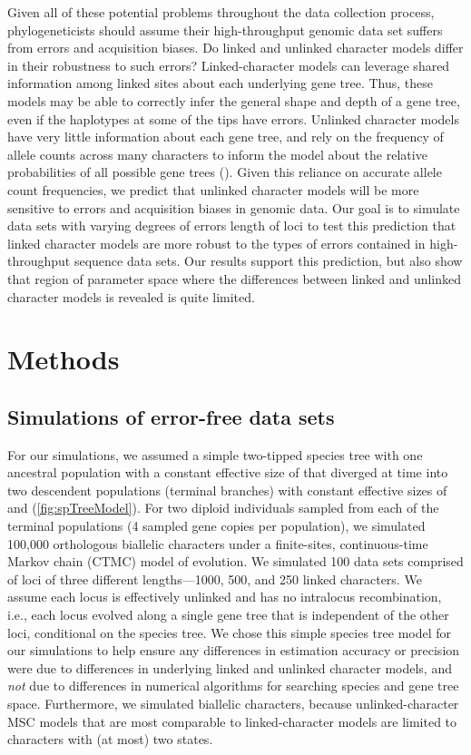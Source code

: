 Given all of these potential problems throughout the data collection process,
phylogeneticists should assume their high-throughput genomic data set suffers
from errors and acquisition biases.
Do linked and unlinked character models differ in their robustness to such
errors?
Linked-character models can leverage shared information among linked sites
about each underlying gene tree.
Thus, these models may be able to correctly infer the general shape and depth
of a gene tree, even if the haplotypes at some of the tips have errors.
Unlinked character models have very little information about each gene tree,
and rely on the frequency of allele counts across many characters to inform the
model about the relative probabilities of all possible gene trees
().
Given this reliance on accurate allele count frequencies, we predict that
unlinked character models will be more sensitive to errors and acquisition
biases in genomic data.
Our goal is to simulate data sets with varying degrees of errors length of loci
to test this prediction that linked character models are more robust to the
types of errors contained in high-throughput sequence data sets.
Our results support this prediction, but also show that region of parameter
space where the differences between linked and unlinked character models is
revealed is quite limited.


\section{Methods}

\subsection{Simulations of error-free data sets}
For our simulations, we assumed a simple two-tipped species tree with one 
ancestral population with a constant effective size of \rootpopsize that 
diverged at time \divtime into two descendent populations (terminal branches) 
with constant effective sizes of \tippopsize[1] and \tippopsize[2] (\cref{fig:spTreeModel}).
For two diploid individuals sampled from each of the terminal
populations (4 sampled gene copies per population),
we simulated 100,000 orthologous biallelic characters under a finite-sites,
continuous-time Markov chain (CTMC) model of evolution.
We simulated 100 data sets comprised of loci of three different lengths---1000,
500, and 250 linked characters.
We assume each locus is effectively unlinked and has no intralocus
recombination, i.e., each locus evolved along a single gene tree that is
independent of the other loci, conditional on the species tree.
We chose this simple species tree model for our simulations to help ensure any
differences in estimation accuracy or precision were due to differences in
underlying linked and unlinked character models,
and \emph{not} due to differences in numerical algorithms for searching species
and gene tree space.
Furthermore, we simulated biallelic characters, because unlinked-character MSC
models
\citep{bryantInferringSpeciesTrees2012,Oaks2018ecoevolity}
that are most comparable to linked-character models
\citep{Heled2010,ogilvieStarBEAST2BringsFaster2017}
are limited to characters with (at most) two states.

